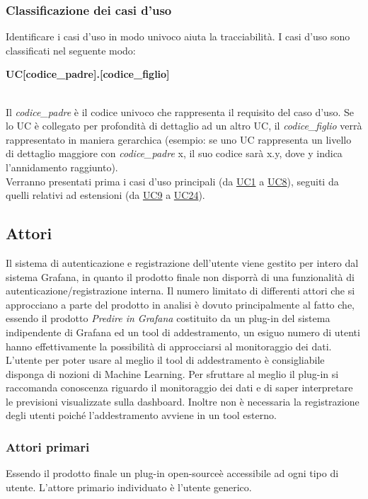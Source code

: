 \subsubsection{Classificazione dei casi d'uso}
Identificare i casi d’uso in modo univoco aiuta la tracciabilità. I casi d’uso sono classificati nel seguente modo: \\
\centerline{\textbf{UC[codice\_padre].[codice\_figlio]}} \\
Il \textit{codice\_padre} è il codice univoco che rappresenta il requisito del caso d’uso. Se lo UC è collegato per profondità di dettaglio ad un altro UC, il \textit{codice\_figlio} verrà rappresentato in maniera gerarchica (esempio: se uno UC rappresenta un livello di dettaglio maggiore con \textit{codice\_padre} x, il suo codice sarà x.y, dove y indica l’annidamento raggiunto). \\ Verranno presentati prima i casi d'uso principali (da \hyperref[par:UC1]{UC1} a \hyperref[par:UC8]{UC8}), seguiti da quelli relativi ad estensioni (da \hyperref[par:UC9]{UC9} a \hyperref[par:UC24]{UC24}).

	\subsection{Attori}
Il sistema di autenticazione e registrazione dell’utente viene gestito per intero dal sistema Grafana, in quanto il prodotto finale non disporrà di una funzionalità di autenticazione/registrazione interna.									
Il numero limitato di differenti attori che si approcciano a parte del prodotto in analisi è dovuto principalmente al fatto che, essendo il prodotto \emph{Predire in Grafana} costituito da un plug-in del sistema indipendente di Grafana ed un tool di addestramento, un esiguo numero di utenti hanno effettivamente la possibilità di approcciarsi al monitoraggio dei dati.
L'utente per poter usare al meglio il tool di addestramento è consigliabile disponga di nozioni di Machine Learning. Per sfruttare al meglio il plug-in si raccomanda conoscenza riguardo il monitoraggio dei dati e di saper interpretare le previsioni visualizzate sulla dashboard.
 Inoltre non è necessaria la  registrazione degli utenti poiché l'addestramento avviene in un tool esterno.


	\subsubsection{Attori primari}
Essendo il prodotto finale un plug-in open-source\glo è accessibile ad ogni tipo di utente. L'attore primario individuato è l'utente generico.
